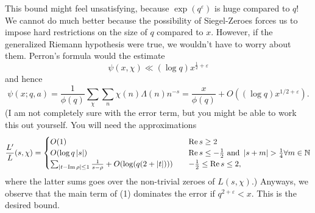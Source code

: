 \documentclass[a4paper,11pt]{article}
\begin{document}
This bound might feel unsatisfying, because $\exp(q^{\varepsilon})$ is huge 
compared to $q$! 
We cannot do much better because the possibility of Siegel-Zeroes
forces us to impose hard restrictions on the size of $q$ compared to $x$. However,
if the generalized Riemann hypothesis were true, we wouldn't have to worry about 
them. Perron's formula would the estimate
\[
    \psi(x, \chi) \ll (\log q) x^{\frac 12 + \varepsilon}
\]
and hence 
\begin{equation}
    \psi(x; q, a) = \frac 1{\phi(q)} \sum_\chi \sum_n \chi(n) \Lambda(n) n^{-s}
    = \frac{x}{\phi(q)} + O((\log q)x^{1/2 + \varepsilon}).
\end{equation}
(I am not completely sure with the error term, but you might be able to work this
out yourself. You will need the approximations
\[
    \frac{L'}L (s, \chi) = \begin{cases}
        O(1) \quad &\operatorname{Re} s \geq 2 \\
        O(\log q \left\lvert s \right\rvert) \quad &\operatorname{Re} s \leq -\tfrac 12 \text{ and }
        \left\lvert s+m \right\rvert > \tfrac 14 \forall m \in \mathbb{N} \\
        \sum_{\left\lvert t- \operatorname{Im} \rho \right\rvert \leq 1} \frac 1{s-\rho} + 
        O( \log (q( 2+ \left\lvert t \right\rvert))) \quad & -\frac 12 \leq \operatorname{Re} s \leq 2,
    \end{cases}
\]
where the latter sums goes over the non-trivial zeroes of $L(s, \chi)$.)
Anyways, we observe that the main term of (1) dominates the error if
$q^{2+\varepsilon} < x$. This is the desired bound. 
\end{document}
